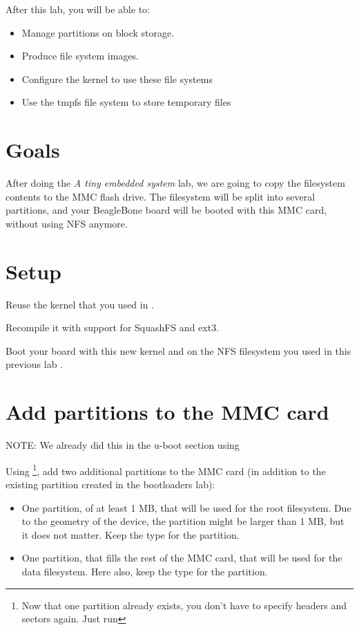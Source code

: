 
After this lab, you will be able to:
\begin{itemize}
\item Manage partitions on block storage.
\item Produce file system images.
\item Configure the kernel to use these file systems
\item Use the tmpfs file system to store temporary files
\end{itemize}

\section{Goals}

After doing the {\em A tiny embedded system} lab, we are going to copy
the filesystem contents to the MMC flash drive. The filesystem will be
split into several partitions, and your BeagleBone board will be booted with
this MMC card, without using NFS anymore.

\section{Setup}

Reuse the kernel that you used in .

Recompile it with support for SquashFS and ext3.

Boot your board with this new kernel and on the NFS filesystem you
used in this previous lab .

\section{Add partitions to the MMC card}

NOTE: We already did this in the u-boot section using 

Using 
\footnote{Now that one partition already exists, you don't have to specify
headers and sectors again. Just run },
add two additional partitions to the MMC card (in
addition to the existing  partition created in the
bootloaders lab):

\begin{itemize}

\item One partition, of at least 1 MB, that will be used for the root
  filesystem. Due to the geometry of the device, the partition might
  be larger than 1 MB, but it does not matter. Keep the 
  type for the partition.

\item One partition, that fills the rest of the MMC card, that will be
  used for the data filesystem. Here also, keep the  type
  for the partition.

\end{itemize}

